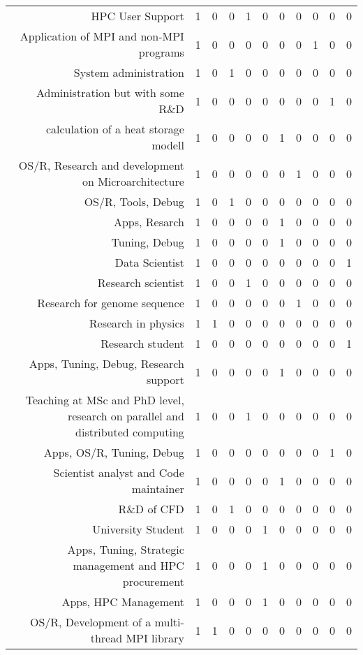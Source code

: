 {\begin{landscape}
\begin{longtable}[htb]{r|c|c|c|c|c|c|c|c|c|c}
{HPC User Support} & 1 & 0 & 0 & 1 & 0 & 0 & 0 & 0 & 0 & 0 \\%
{Application of MPI and non-MPI programs} & 1 & 0 & 0 & 0 & 0 & 0 & 0 & 1 & 0 & 0 \\%
{System administration} & 1 & 0 & 1 & 0 & 0 & 0 & 0 & 0 & 0 & 0 \\%
{Administration but with some R\&D} & 1 & 0 & 0 & 0 & 0 & 0 & 0 & 0 & 1 & 0 \\%
{calculation of a heat storage modell} & 1 & 0 & 0 & 0 & 0 & 1 & 0 & 0 & 0 & 0 \\%
{OS/R, Research and development on Microarchitecture} & 1 & 0 & 0 & 0 & 0 & 0 & 1 & 0 & 0 & 0 \\%
{OS/R, Tools, Debug} & 1 & 0 & 1 & 0 & 0 & 0 & 0 & 0 & 0 & 0 \\%
{Apps, Resarch} & 1 & 0 & 0 & 0 & 0 & 1 & 0 & 0 & 0 & 0 \\%
{Tuning, Debug} & 1 & 0 & 0 & 0 & 0 & 1 & 0 & 0 & 0 & 0 \\%
{Data Scientist} & 1 & 0 & 0 & 0 & 0 & 0 & 0 & 0 & 0 & 1 \\%
{Research scientist} & 1 & 0 & 0 & 1 & 0 & 0 & 0 & 0 & 0 & 0 \\%
{Research for genome sequence} & 1 & 0 & 0 & 0 & 0 & 0 & 1 & 0 & 0 & 0 \\%
{Research in physics} & 1 & 1 & 0 & 0 & 0 & 0 & 0 & 0 & 0 & 0 \\%
{Research student} & 1 & 0 & 0 & 0 & 0 & 0 & 0 & 0 & 0 & 1 \\%
{Apps, Tuning, Debug, Research support} & 1 & 0 & 0 & 0 & 0 & 1 & 0 & 0 & 0 & 0 \\%
{Teaching at MSc and PhD level, research on parallel and distributed computing} & 1 & 0 & 0 & 1 & 0 & 0 & 0 & 0 & 0 & 0 \\%
{Apps, OS/R, Tuning, Debug} & 1 & 0 & 0 & 0 & 0 & 0 & 0 & 0 & 1 & 0 \\%
{Scientist analyst and Code maintainer} & 1 & 0 & 0 & 0 & 0 & 1 & 0 & 0 & 0 & 0 \\%
{R\&D of CFD} & 1 & 0 & 1 & 0 & 0 & 0 & 0 & 0 & 0 & 0 \\%
{University Student} & 1 & 0 & 0 & 0 & 1 & 0 & 0 & 0 & 0 & 0 \\%
{Apps, Tuning, Strategic management and HPC procurement} & 1 & 0 & 0 & 0 & 1 & 0 & 0 & 0 & 0 & 0 \\%
{Apps, HPC Management} & 1 & 0 & 0 & 0 & 1 & 0 & 0 & 0 & 0 & 0 \\%
{OS/R, Development of a  multi-thread MPI library} & 1 & 1 & 0 & 0 & 0 & 0 & 0 & 0 & 0 & 0 \\%

\end{longtable}
\end{landscape}}
